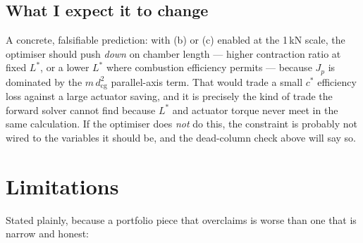 \documentclass[11pt]{article}
\begin{document}
\subsection{What I expect it to change}

A concrete, falsifiable prediction: with (b) or (c) enabled at the 1\,kN
scale, the optimiser should push \emph{down} on chamber length --- higher
contraction ratio at fixed $L^*$, or a lower $L^*$ where combustion
efficiency permits --- because $J_p$ is dominated by the
$m\,d_{\text{cg}}^2$ parallel-axis term. That would trade a small $c^*$
efficiency loss against a large actuator saving, and it is precisely the
kind of trade the forward solver cannot find because $L^*$ and actuator
torque never meet in the same calculation. If the optimiser does \emph{not}
do this, the constraint is probably not wired to the variables it should be,
and the dead-column check above will say so.

\section{Limitations}

Stated plainly, because a portfolio piece that overclaims is worse than one
that is narrow and honest:
\end{document}
